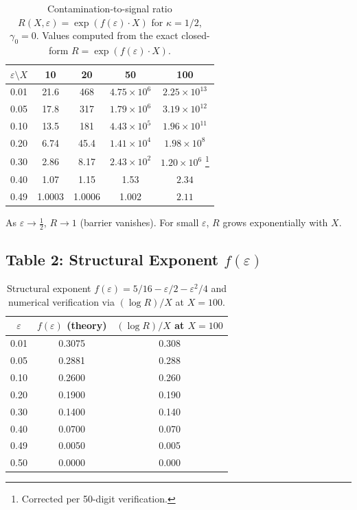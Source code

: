 \documentclass[12pt]{article}
\theoremstyle{remark}
\begin{document}
\begin{table}[ht]
\centering
\caption{Contamination-to-signal ratio $R(X,\varepsilon) = \exp(f(\varepsilon)\cdot X)$
for $\kappa = 1/2$, $\gamma_0 = 0$.
Values computed from the exact closed-form $R = \exp(f(\varepsilon)\cdot X)$.}
\label{tab:R}
\begin{tabular}{@{}lcccc@{}}
\toprule
$\varepsilon \setminus X$ & 10 & 20 & 50 & 100 \\
\midrule
0.01  & 21.6          & 468            & $4.75\times 10^6$    & $2.25\times 10^{13}$ \\
0.05  & 17.8          & 317            & $1.79\times 10^6$    & $3.19\times 10^{12}$ \\
0.10  & 13.5          & 181            & $4.43\times 10^5$    & $1.96\times 10^{11}$ \\
0.20  & 6.74          & 45.4           & $1.41\times 10^4$    & $1.98\times 10^8$ \\
0.30  & 2.86          & 8.17           & $2.43\times 10^2$    & $1.20\times 10^6$ \footnote{Corrected per 50-digit verification.} \\
0.40  & 1.07          & 1.15           & 1.53                 & $2.34$ \\
0.49  & 1.0003        & 1.0006         & 1.002                & $2.11$ \\
\bottomrule
\end{tabular}
\end{table}

As $\varepsilon \to \tfrac{1}{2}$, $R \to 1$ (barrier vanishes).
For small $\varepsilon$, $R$ grows exponentially with $X$.

\subsection{Table 2: Structural Exponent $f(\varepsilon)$}

\begin{table}[ht]
\centering
\caption{Structural exponent $f(\varepsilon) = 5/16 - \varepsilon/2 - \varepsilon^2/4$ and numerical verification via $(\log R)/X$ at $X=100$.}
\label{tab:feps}
\begin{tabular}{@{}ccc@{}}
\toprule
$\varepsilon$ & $f(\varepsilon)$ (theory) & $(\log R)/X$ at $X=100$ \\
\midrule
0.01 & 0.3075 & 0.308 \\
0.05 & 0.2881 & 0.288 \\
0.10 & 0.2600 & 0.260 \\
0.20 & 0.1900 & 0.190 \\
0.30 & 0.1400 & 0.140 \\
0.40 & 0.0700 & 0.070 \\
0.49 & 0.0050 & 0.005 \\
0.50 & 0.0000 & 0.000 \\
\bottomrule
\end{tabular}
\end{table}
\end{document}
